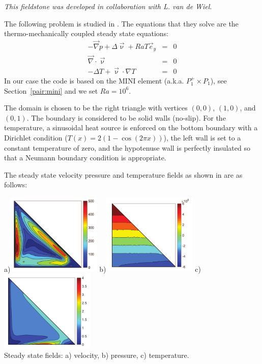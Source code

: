 

{\sl This fieldstone was developed in collaboration with L. van de Wiel}. 

The following problem is studied in \cite{jolm17}. The equations that they solve are the thermo-mechanically coupled steady state equations:
\begin{eqnarray}
-\vec{\nabla}p + \Delta \vec{\upnu} + Ra T \vec{e}_y &=& 0\\
\vec\nabla\cdot\vec\upnu &=& 0 \\
-\Delta T + \vec\upnu\cdot\nabla T &=& 0
\end{eqnarray}
In our case the code is based on the MINI element (a.k.a. $P_1^+ \times P_1$), see Section~\ref{pair:mini}
and we set $Ra=10^6$.

The domain is chosen to be the right triangle
with vertices $(0,0)$, $(1,0)$, and $(0,1)$. 
The boundary is considered to be solid walls (no-slip).
For the temperature, a sinusoidal heat source is enforced on the bottom
boundary with a Dirichlet condition ($T(x)=2(1-\cos (2\pi x))$), 
the left wall is set to a constant temperature
of zero, and the hypotenuse wall is perfectly insulated so that a Neumann 
boundary condition is appropriate.

The steady state velocity pressure and temperature fields as shown in 
\cite{jolm17} are as follows:

\begin{center}
a)\includegraphics[width=4.5cm]{python_codes/fieldstone_51/images/jolm17_vel}
b)\includegraphics[width=4.5cm]{python_codes/fieldstone_51/images/jolm17_p}
c)\includegraphics[width=4.5cm]{python_codes/fieldstone_51/images/jolm17_T}\\
{\small Steady state fields: a) velocity, b) pressure, c) temperature.}
\end{center}

